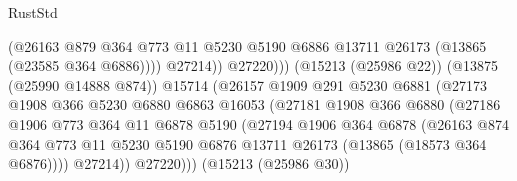 \begin{lexlean}{RustStd}
\begin{coremodule}
                                          (@26163
                                            @879
                                            @364
                                            @773
                                            @11
                                            @5230
                                            @5190
                                            @6886
                                            @13711
                                            @26173
                                            (@13865 (@23585 @364 @6886))))
                                        @27214))
                                    @27220)))
                              (@15213 (@25986 @22))
                              (@13875 (@25990 @14888 @874))
                              @15714
                              (@26157
                                @1909
                                @291
                                @5230
                                @6881
                                (@27173
                                  @1908
                                  @366
                                  @5230
                                  @6880
                                  @6863
                                  @16053
                                  (@27181
                                    @1908
                                    @366
                                    @6880
                                    (@27186
                                      @1906
                                      @773
                                      @364
                                      @11
                                      @6878
                                      @5190
                                      (@27194
                                        @1906
                                        @364
                                        @6878
                                        (@26163
                                          @874
                                          @364
                                          @773
                                          @11
                                          @5230
                                          @5190
                                          @6876
                                          @13711
                                          @26173
                                          (@13865 (@18573 @364 @6876))))
                                      @27214))
                                  @27220)))
                            (@15213 (@25986 @30))

\end{coremodule}
\end{lexlean}

